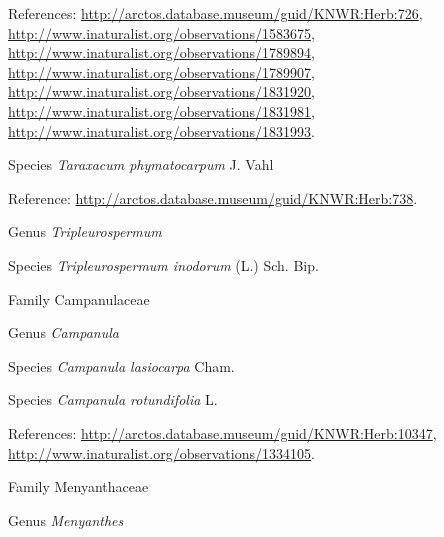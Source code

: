 \documentclass[9pt, article]{memoir}
\begin{document}
\begin{multicols}{2}
\vspace{6pt}References: 
\url{http://arctos.database.museum/guid/KNWR:Herb:726}, 
\url{http://www.inaturalist.org/observations/1583675}, 
\url{http://www.inaturalist.org/observations/1789894}, 
\url{http://www.inaturalist.org/observations/1789907}, 
\url{http://www.inaturalist.org/observations/1831920}, 
\url{http://www.inaturalist.org/observations/1831981}, 
\url{http://www.inaturalist.org/observations/1831993}.

\vspace{6pt}\noindent\hspace{36pt}Species \textit{Taraxacum phymatocarpum} J. Vahl


\vspace{6pt}Reference: 
\url{http://arctos.database.museum/guid/KNWR:Herb:738}.

\vspace{6pt}\noindent\hspace{30pt}Genus \textit{Tripleurospermum}


\vspace{6pt}\noindent\hspace{36pt}Species \textit{Tripleurospermum inodorum} (L.) Sch. Bip.


\vspace{6pt}\noindent\hspace{24pt}Family Campanulaceae


\vspace{6pt}\noindent\hspace{30pt}Genus \textit{Campanula}


\vspace{6pt}\noindent\hspace{36pt}Species \textit{Campanula lasiocarpa} Cham.


\vspace{6pt}\noindent\hspace{36pt}Species \textit{Campanula rotundifolia} L.


\vspace{6pt}References: 
\url{http://arctos.database.museum/guid/KNWR:Herb:10347}, 
\url{http://www.inaturalist.org/observations/1334105}.

\vspace{6pt}\noindent\hspace{24pt}Family Menyanthaceae


\vspace{6pt}\noindent\hspace{30pt}Genus \textit{Menyanthes}



\end{multicols}
\end{document}
